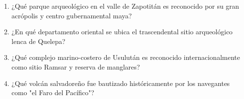 \documentclass[10pt,a4paper]{article}
\begin{document}
\begin{enumerate}[label=\textbf{\arabic*.}]
\item ¿Qué parque arqueológico en el valle de Zapotitán es reconocido por su gran acrópolis y centro gubernamental maya?
\begin{enumerate}[label=\textbf{\Alph*)}]
\end{enumerate}
\vspace{0.15cm}
\item ¿En qué departamento oriental se ubica el trascendental sitio arqueológico lenca de Quelepa?
\begin{enumerate}[label=\textbf{\Alph*)}]
\end{enumerate}
\vspace{0.15cm}
\item ¿Qué complejo marino-costero de Usulután es reconocido internacionalmente como sitio Ramsar y reserva de manglares?
\begin{enumerate}[label=\textbf{\Alph*)}]
\end{enumerate}
\vspace{0.15cm}
\item ¿Qué volcán salvadoreño fue bautizado históricamente por los navegantes como "el Faro del Pacífico"?
\begin{enumerate}[label=\textbf{\Alph*)}]
\end{enumerate}
\end{enumerate}
\end{document}
